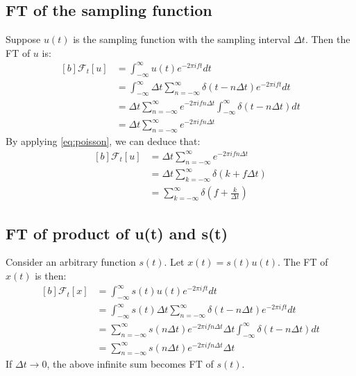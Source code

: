 \documentclass[letterpaper, 11pt]{article}
\newcommand{\fint}{\int_{-\infty}^{\infty}} %
\newcommand{\fsum}[1]{\sum_{#1 = -\infty}^{\infty}} %
\newcommand{\spf}[2]{\Delta #1 \fsum{#2} \delta (#1 - #2 \Delta #1)} %
\newcommand{\fourier}[2]{\mathcal{F}_{#1}[#2]} %
\newcommand{\ft}[3]{\fint #2 e^{-2\pi i#3#1} d#1} %
\numberwithin{equation}{section}
\numberwithin{figure}{section}
\begin{document}
\subsection{FT of the sampling function}
Suppose \(u(t)\) is the sampling function with the sampling interval \(\Delta t\). Then the FT of \(u\) is:
\begin{equation}
	\begin{aligned}[b]
		\fourier{t}{u}
			&= \ft{t}{u(t)}{f} \\
			&= \ft{t}{\spf{t}{n}}{f} \\
			&= \Delta t \fsum{n} e^{-2\pi ifn\Delta t} \fint \delta (t - n \Delta t) dt \\
			&= \Delta t \fsum{n} e^{-2\pi ifn\Delta t}
	\end{aligned}
\end{equation}
By applying \eqref{eq:poisson}, we can deduce that:
\begin{equation}
	\begin{aligned}[b]
		\fourier{t}{u}
			&= \Delta t \fsum{n} e^{-2\pi ifn\Delta t} \\
			&= \Delta t \fsum{k} \delta (k + f \Delta t)\\
			&= \fsum{k} \delta (f + \frac{k}{\Delta t})
	\end{aligned}
\end{equation}

\subsection{FT of product of u(t) and s(t)}\label{sec:su}
Consider an arbitrary function \(s(t)\). Let \(x(t) = s(t)u(t)\). The FT of \(x(t)\) is then:
\begin{equation}
	\begin{aligned}[b]
		\fourier{t}{x}
			&= \ft{t}{s(t)u(t)}{f}\\
			&= \ft{t}{s(t) \spf{t}{n}}{f}\\
			&= \fsum{n} s(n \Delta t) e^{-2\pi ifn\Delta t} \Delta t 
			   \fint \delta (t - n\Delta t) dt\\
			&= \fsum{n} s(n \Delta t) e^{-2\pi ifn\Delta t} \Delta t 
			\label{eq:ftsu}
	\end{aligned}
\end{equation}
If \(\Delta t \to 0\), the above infinite sum becomes FT of \(s(t)\). 
\end{document}
